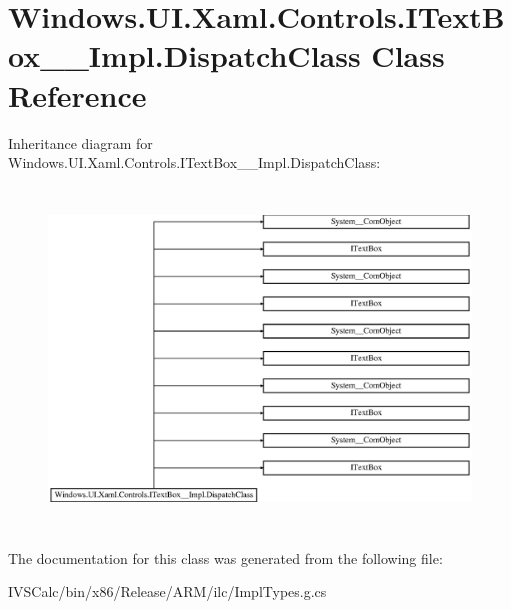 \hypertarget{class_windows_1_1_u_i_1_1_xaml_1_1_controls_1_1_i_text_box_____impl_1_1_dispatch_class}{}\section{Windows.\+U\+I.\+Xaml.\+Controls.\+I\+Text\+Box\+\_\+\+\_\+\+Impl.\+Dispatch\+Class Class Reference}
\label{class_windows_1_1_u_i_1_1_xaml_1_1_controls_1_1_i_text_box_____impl_1_1_dispatch_class}
Inheritance diagram for Windows.\+U\+I.\+Xaml.\+Controls.\+I\+Text\+Box\+\_\+\+\_\+\+Impl.\+Dispatch\+Class\+:\begin{figure}[H]
\begin{center}
\leavevmode
\includegraphics[height=9.085546cm]{class_windows_1_1_u_i_1_1_xaml_1_1_controls_1_1_i_text_box_____impl_1_1_dispatch_class}
\end{center}
\end{figure}


The documentation for this class was generated from the following file\+:\begin{DoxyCompactItemize}
\item 
I\+V\+S\+Calc/bin/x86/\+Release/\+A\+R\+M/ilc/Impl\+Types.\+g.\+cs\end{DoxyCompactItemize}
